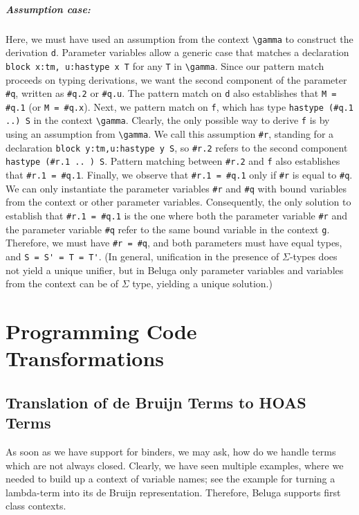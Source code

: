  \paragraph{Assumption case:} Here, we must have used an assumption from the
 context \lstinline!\gamma! to construct the derivation \lstinline{d}.  Parameter variables
  allow a generic case that matches a declaration
\lstinline!block x:tm, u:hastype x T! for any \lstinline{T} in \lstinline!\gamma!. Since our pattern match
 proceeds on typing derivations, we want the second component of the
 parameter \lstinline{#q}, written as \lstinline{#q.2} or \lstinline!#q.u!.  The pattern match on \lstinline{d}
 also establishes that \lstinline{M = #q.1} (or \lstinline!M = #q.x!).
 Next, we pattern match on \lstinline{f}, which has type
\lstinline!hastype (#q.1 ..) S! in the context \lstinline!\gamma!.  Clearly, the only
 possible way to derive \lstinline{f} is by using an assumption from \lstinline!\gamma!. We call
 this assumption \lstinline{#r}, standing for a declaration
\lstinline!block y:tm,u:hastype y S!, so \lstinline{#r.2} refers to the second component
\lstinline!hastype (#r.1 .. ) S!. Pattern matching between \lstinline{#r.2} and \lstinline{f}
 also establishes that %
 \lstinline{#r.1 = #q.1}.  Finally, we observe that \lstinline{#r.1 = #q.1} only if
 \lstinline{#r} is equal to \lstinline{#q}. We can only instantiate the parameter
 variables \lstinline!#r! and \lstinline!#q! with bound variables from
 the context or other parameter variables. Consequently, the only
 solution to establish that \lstinline{#r.1 = #q.1} is the one where both the
 parameter variable \lstinline!#r! and the parameter variable
 \lstinline!#q! refer to the same bound variable in
 the context \lstinline!g!.  Therefore, we must have
 \lstinline!#r = #q!, and both
 parameters must have equal types, and \lstinline{S = S' = T = T'}.  (In general,
 unification in the presence
 of $\Sigma$-types does not yield a unique unifier, but in Beluga only
 parameter variables and variables from the context can be of $\Sigma$ type,
 yielding a unique solution.)




\chapter{Programming Code Transformations }
\section{Translation of de Bruijn Terms to HOAS Terms} 
As soon as we have support for binders,
we may ask, how do we handle terms which are not always
closed. Clearly, we have seen multiple examples, where we needed to
build up a context of variable names; see the example for turning a
lambda-term into its de Bruijn representation.
%
Therefore, Beluga supports first class contexts.

